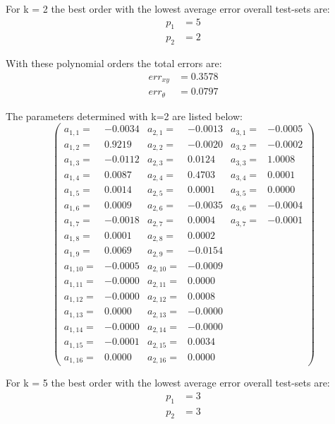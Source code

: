 \documentclass[conference]{IEEEtran}
\begin{document}
\begin{compactenum}[a)]

\item For k = 2 the best order with the lowest average error overall test-sets are:
\begin{align}
	p_1 & = 5\\
	p_2 & = 2
\end{align}

With these polynomial orders the total errors are:
\begin{align}
	err_{xy} & = 0.3578\\
	err_{\theta} & = 0.0797
\end{align}

The parameters determined with k=2 are listed below:
$$
\left(
\scriptscriptstyle{
\begin{smallmatrix}
a_{1,1} =& -0.0034 	& a_{2,1} =& -0.0013 & a_{3,1} =& -0.0005\\
a_{1,2} =&  0.9219  & a_{2,2} =& -0.0020 & a_{3,2} =& -0.0002\\
a_{1,3} =& -0.0112 	& a_{2,3} =&  0.0124 & a_{3,3} =&  1.0008\\
a_{1,4} =&  0.0087  & a_{2,4} =&  0.4703 & a_{3,4} =&  0.0001\\
a_{1,5} =&  0.0014  & a_{2,5} =&  0.0001 & a_{3,5} =&  0.0000\\
a_{1,6} =&  0.0009  & a_{2,6} =& -0.0035 & a_{3,6} =& -0.0004\\
a_{1,7} =& -0.0018 	& a_{2,7} =&  0.0004 & a_{3,7} =& -0.0001\\
a_{1,8} =&  0.0001  & a_{2,8} =&  0.0002	\\
a_{1,9} =&  0.0069  & a_{2,9} =& -0.0154	\\
a_{1,10} =&-0.0005 	& a_{2,10} =&-0.0009	\\
a_{1,11} =&-0.0000 	& a_{2,11} =& 0.0000	\\
a_{1,12} =&-0.0000 	& a_{2,12} =& 0.0008	\\
a_{1,13} =& 0.0000  & a_{2,13} =&-0.0000	\\
a_{1,14} =&-0.0000 	& a_{2,14} =&-0.0000	\\
a_{1,15} =&-0.0001 	& a_{2,15} =& 0.0034	\\
a_{1,16} =& 0.0000  & a_{2,16} =& 0.0000	
\end{smallmatrix}}
\right)
$$

\item For k = 5 the best order with the lowest average error overall test-sets are:
\begin{align}
	p_1 & = 3\\
	p_2 & = 3
\end{align}


\end{compactenum}
\end{document}
